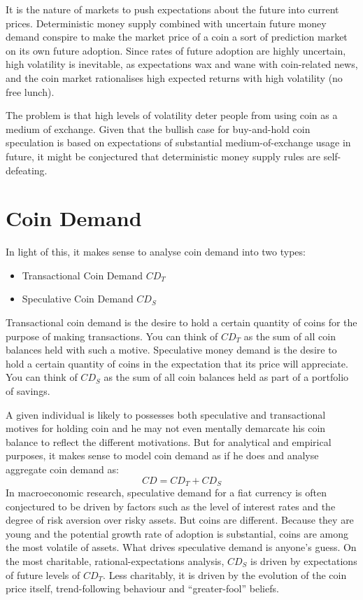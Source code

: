 \documentclass[twocolumn]{article}
\begin{document}
It is the nature of markets to push expectations about the future into
current prices. Deterministic money supply combined with uncertain
future money demand conspire to make the market price of a coin a sort
of prediction market on its own future adoption. Since rates of future
adoption are highly uncertain, high volatility is inevitable, as
expectations wax and wane with coin-related news, and the coin market
rationalises high expected returns with high volatility (no free
lunch).

The problem is that high levels of volatility deter people from using
coin as a medium of exchange. Given that the bullish case for
buy-and-hold coin speculation is based on expectations of substantial
medium-of-exchange usage in future, it might be conjectured that
deterministic money supply rules are self-defeating.

\section*{Coin Demand}
In light of this, it makes sense to analyse coin demand into two
types:
\begin{itemize}
\item Transactional Coin Demand $CD_{T}$
\item Speculative Coin Demand $CD_{S}$
\end{itemize}
Transactional coin demand is the desire to hold a certain quantity of
coins for the purpose of making transactions. You can think of
$CD_{T}$ as the sum of all coin balances held with such a
motive. Speculative money demand is the desire to hold a certain
quantity of coins in the expectation that its price will
appreciate. You can think of $CD_{S}$ as the sum of all coin balances
held as part of a portfolio of savings. 

A given individual is likely to possesses both speculative and
transactional motives for holding coin and he may not even mentally
demarcate his coin balance to reflect the different motivations. But
for analytical and empirical purposes, it makes sense to model coin
demand as if he does and analyse aggregate coin demand as:
\begin{equation}
CD = CD_{T} + CD_{S}
\end{equation}
In macroeconomic research, speculative demand for a fiat currency is
often conjectured to be driven by factors such as the level of
interest rates and the degree of risk aversion over risky assets. But
coins are different. Because they are young and the potential growth
rate of adoption is substantial, coins are among the most volatile of
assets. What drives speculative demand is anyone's guess. On the most
charitable, rational-expectations analysis, $CD_{S}$ is driven by
expectations of future levels of $CD_{T}$. Less charitably, it is
driven by the evolution of the coin price itself, trend-following
behaviour and ``greater-fool'' beliefs.
\end{document}
